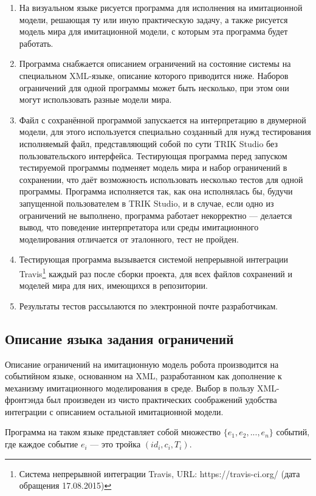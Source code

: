 \documentclass[conference]{IEEEtran}
\begin{document}
\begin{enumerate}
	\item На визуальном языке рисуется программа для исполнения на имитационной модели, решающая ту или 
			иную практическую задачу, а также рисуется модель мира для имитационной модели, с которым эта программа будет работать.
	\item Программа снабжается описанием ограничений на состояние системы на специальном XML-языке, описание 
			которого приводится ниже. Наборов ограничений для одной программы может быть несколько, при этом 
			они могут использовать разные модели мира.
	\item Файл с сохранённой программой запускается на интерпретацию в двумерной модели, для этого используется 
			специально созданный для нужд тестирования исполняемый файл, представляющий собой по сути TRIK Studio 
			без пользовательского интерфейса. Тестирующая программа перед запуском тестируемой программы подменяет 
			модель мира и набор ограничений в сохранении, что даёт возможность использовать несколько тестов 
			для одной программы. Программа исполняется так, как она исполнялась бы, будучи запущенной пользователем 
			в TRIK Studio, и в случае, если одно из ограничений не выполнено, программа работает некорректно --- делается 
			вывод, что поведение интерпретатора или среды имитационного моделирования отличается от эталонного, 
			тест не пройден.
	\item Тестирующая программа вызывается системой непрерывной интеграции Travis\footnote{Система непрерывной интеграции Travis, URL: https://travis-ci.org/ (дата обращения 17.08.2015)} 
			каждый раз после сборки проекта, для всех файлов сохранений и моделей мира для них, имеющихся в репозитории.
	\item Результаты тестов рассылаются по электронной почте разработчикам.
\end{enumerate}

\subsection{Описание языка задания ограничений}
Описание ограничений на имитационную модель робота производится на событийном языке, основанном на XML, разработанном 
как дополнение к механизму имитационного моделирования в среде. Выбор в пользу XML-фронтэнда был произведен 
из чисто практических соображений удобства интеграции с описанием остальной имитационной модели.

Программа на таком языке представляет собой множество $\{ e_1, e_2, ..., e_n \}$ событий, где каждое событие 
$e_i$ --- это тройка $(id_i, c_i, T_i)$.
\end{document}
